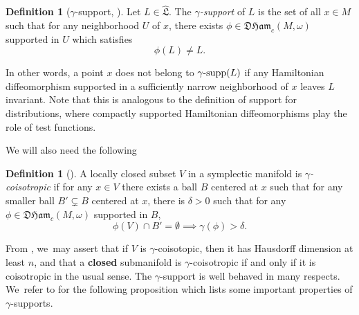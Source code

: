\documentclass[JEP,XML,SOM,Unicode,NoFloatCountersInSection,published]{cedram}
\theoremstyle{definition}
\newtheorem{defn}[thm]{Definition}
\DeclareMathOperator{\gammasupp}{\gamma\textup{-supp}}
\newcommand{\DHam}{\mathfrak{DHam}}
\newcommand{\fL}{\mathfrak {L}}
\newcommand{\hatL}{\widehat{\fL}}
\begin{document}
\begin{defn}[$\gamma$-support, \cite{Viterbo-gammas}]\label{defgamma} Let $L\in \hatL$. The \emph{$\gamma$\nobreakdash-support} of $L$ is the set of all $x\in M$ such that for any neighborhood $U$ of $x$, there exists $\phi\in\DHam_c(M,\omega)$ supported in $U$ which satisfies
\[
\phi(L)\neq L.
\]
\end{defn}

In other words, a point $x$ does not belong to $\gammasupp(L)$ if any Hamiltonian diffeomorphism supported in a sufficiently narrow neighborhood of $x$ leaves $L$ invariant. Note that this is analogous to the definition of support for
distributions, where compactly supported Hamiltonian diffeomorphisms play the role of test functions.

We will also need the following
\begin{defn}[\cite{Usher-rigidity,Viterbo-gammas}]
A locally closed subset $V$ in a symplectic manifold is \emph{$\gamma$\nobreakdash-coisotropic} if for any $x\in V$ there exists a ball $B$ centered at $x$ such that for any smaller ball $B'\subsetneq B$ centered at $x$, there is $\delta>0$ such that for any $\phi\in\DHam_c(M,\omega)$ supported in $B$,\vspace*{-3pt}\enlargethispage{.5\baselineskip}
\[
\phi(V)\cap B'=\emptyset\implies \gamma(\phi)>\delta.
\]
\end{defn}
From \cite{Viterbo-gammas}, we~may assert that if $V$ is $\gamma$\nobreakdash-coisotopic, then it has Hausdorff dimension at least $n$, and that a {\bf closed} submanifold is $\gamma$\nobreakdash-coisotropic if and only if it is coisotropic in the usual sense.
The $\gamma$\nobreakdash-support is well behaved in many respects. We~refer to \cite{Viterbo-gammas} for the following proposition which lists some important properties of $\gamma$\nobreakdash-supports.
\end{document}
